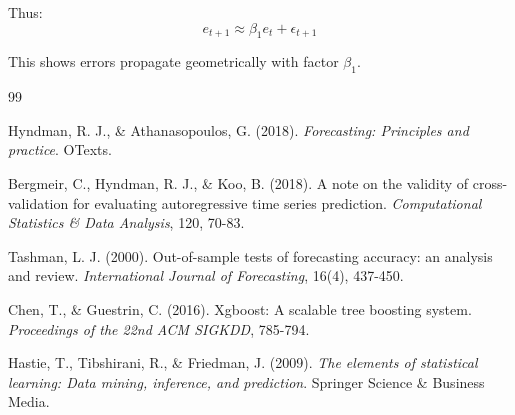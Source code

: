 \documentclass[12pt,a4paper]{article}
\begin{document}
Thus:
\begin{equation}
e_{t+1} \approx \beta_1 e_t + \epsilon_{t+1}
\end{equation}

This shows errors propagate geometrically with factor $\beta_1$.


\begin{thebibliography}{99}

Hyndman, R. J., \& Athanasopoulos, G. (2018).
\textit{Forecasting: Principles and practice}.
OTexts.

Bergmeir, C., Hyndman, R. J., \& Koo, B. (2018).
A note on the validity of cross-validation for evaluating autoregressive time series prediction.
\textit{Computational Statistics \& Data Analysis}, 120, 70-83.

Tashman, L. J. (2000).
Out-of-sample tests of forecasting accuracy: an analysis and review.
\textit{International Journal of Forecasting}, 16(4), 437-450.

Chen, T., \& Guestrin, C. (2016).
Xgboost: A scalable tree boosting system.
\textit{Proceedings of the 22nd ACM SIGKDD}, 785-794.

Hastie, T., Tibshirani, R., \& Friedman, J. (2009).
\textit{The elements of statistical learning: Data mining, inference, and prediction}.
Springer Science \& Business Media.

\end{thebibliography}
\end{document}
